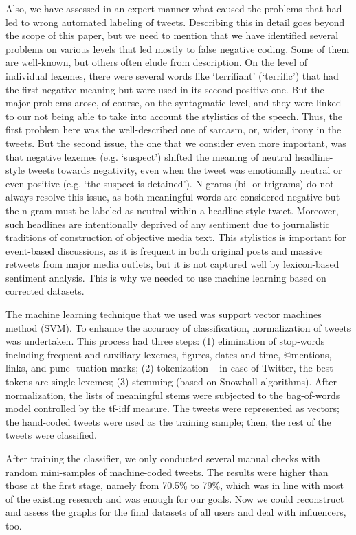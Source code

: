 Also, we have assessed in an expert manner what caused the problems that had led to wrong automated labeling of tweets. Describing this in detail goes beyond the scope of this paper, but we need to mention that we have identified several problems on various levels that led mostly to false negative coding. Some of them are well-known, but others often elude from description. On the level of individual lexemes, there were several words like ‘terrifiant’ (‘terrific’) that had the first negative meaning but were used in its second positive one. But the major problems arose, of course, on the syntagmatic level, and they were linked to our not being able to take into account the stylistics of the speech. Thus, the first problem here was the well-described one of sarcasm, or, wider, irony in the tweets. But the second issue, the one that we consider even more important, was that negative lexemes (e.g. ‘suspect’) shifted the meaning of neutral headline-style tweets towards negativity, even when the tweet was emotionally neutral or even positive (e.g. ‘the suspect is detained’). N-grams (bi- or trigrams) do not always resolve this issue, as both meaningful words are considered negative but the n-gram must be labeled as neutral within a headline-style tweet. Moreover, such headlines are intentionally deprived of any sentiment due to journalistic traditions of construction of objective media text. This stylistics is important for event-based discussions, as it is frequent in both original posts and massive retweets from major media outlets, but it is not captured well by lexicon-based sentiment analysis. This is why we needed to use machine learning based on corrected datasets.

The machine learning technique that we used was support vector machines method (SVM). To enhance the accuracy of classification, normalization of tweets was undertaken. This process had three steps: (1) elimination of stop-words including frequent and auxiliary lexemes, figures, dates and time, @mentions, links, and punc- tuation marks; (2) tokenization -- in case of Twitter, the best tokens are single lexemes; (3) stemming (based on Snowball algorithms). After normalization, the lists of meaningful stems were subjected to the bag-of-words model controlled by the tf-idf measure. The tweets were represented as vectors; the hand-coded tweets were used as the training sample; then, the rest of the tweets were classified.

After training the classifier, we only conducted several manual checks with random mini-samples of machine-coded tweets. The results were higher than those at the first stage, namely from 70.5\% to 79\%, which was in line with most of the existing research and was enough for our goals. Now we could reconstruct and assess the graphs for the final datasets of all users and deal with influencers, too.

